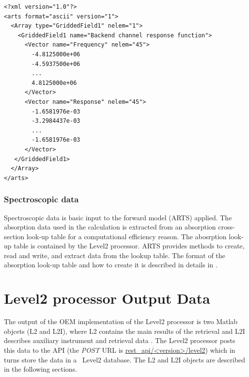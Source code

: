 \lstset{language=XML}
\begin{lstlisting}
<?xml version="1.0"?>
<arts format="ascii" version="1">
  <Array type="GriddedField1" nelem="1">
    <GriddedField1 name="Backend channel response function">
      <Vector name="Frequency" nelem="45">
        -4.8125000e+06
        -4.5937500e+06
        ...
        4.8125000e+06
      </Vector>
      <Vector name="Response" nelem="45">
        -1.6581976e-03
        -3.2984437e-03
        ...
        -1.6581976e-03
      </Vector>
   </GriddedField1>
  </Array>
</arts>
\end{lstlisting}


\subsubsection{Spectroscopic data}

Spectroscopic data is basic input to the forward model (ARTS) applied.
The absorption data used in the calculation is extracted 
from an absorption cross-section look-up table for a computational efficiency reason.
The abosrption look-up table is contained by the Level2 processor.
ARTS provides methods to create, read and write, and 
extract data from the lookup table.
The format of the absorption look-up table and how to create it
is described in details in \citet{artsug}.



\section{Level2 processor Output Data}

The output of the OEM implementation of the Level2 processor is
two Matlab objcets (L2 and L2I), where L2 contains
the main results of the retrieval and L2I describes
auxiliary instrument and retrieval data \citep{atbdl2}.
The Level2 processor posts this data to the API
(the \emph{POST} URL is \url{rest_api/<version>/level2})
which in turns store the data in a \smr\ Level2 database.
The L2 and L2I objects are described in the following sections.

